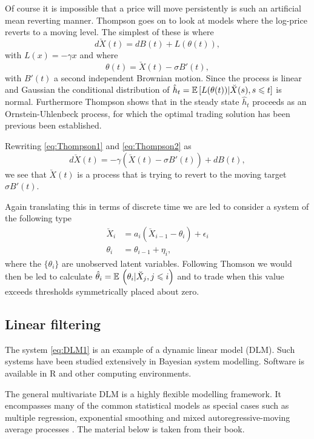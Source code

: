 Of course it is impossible that a price will move persistently is such an artificial mean reverting manner. Thompson goes on to look at models where the log-price reverts to a moving level. The simplest of these is where 
\begin{equation}\label{eq:Thompson1} d\breve{X}(t) = dB(t) + L(\theta(t)),\end{equation}
with $L(x) = -\gamma x$ and where
\begin{equation}\label{eq:Thompson2} \theta(t) = \breve{X}(t) - \sigma B'(t),\end{equation}
with $B'(t)$ a second independent Brownian motion. Since the process is linear and Gaussian the conditional distribution of $\hat{h}_t = \mathbb{E}\,[L(\theta(t)) |\breve{X}(s), s\leqslant t]$ is normal.  Furthermore Thompson shows that in the steady state $\hat{h}_t$  proceeds as an Ornstein-Uhlenbeck process, for which the optimal trading solution has been previous been established.

Rewriting  \eqref{eq:Thompson1} and \eqref{eq:Thompson2}  as
$$d\breve{X}(t) = -\gamma\left(\breve{X}(t) - \sigma B'(t)\right) + dB(t),$$
we see that $\breve{X}(t)$ is a process that is trying to revert to the moving target $ \sigma B'(t)$. 

Again translating this in terms of discrete time we are led to consider a system of the following type
\begin{align}\label{eq:DLM1}
\breve{X}_i &= a_i \left(\breve{X}_{i-1} - \theta_i\right) + \epsilon_i \nonumber\\
\theta_i &= \theta_{i-1} + \eta_i,
\end{align}
where the $\{\theta_i\}$ are unobserved latent variables. Following Thomson we would then be led to calculate $\hat{\theta}_i = \mathbb{E}\,\left(\theta_i | \breve{X}_j, j \leqslant i\right)$ and to trade when this value exceeds thresholds symmetrically placed about zero. 

\subsection{Linear filtering}
The system \eqref{eq:DLM1} is an example of a dynamic linear model (DLM). Such systems have been studied extensively in Bayesian system modelling. Software is available in {\sf R} and other computing environments. 

The general multivariate DLM is a highly flexible modelling framework. It encompasses many of the common statistical models as special cases such as multiple regression,
exponential smoothing and mixed autoregressive-moving average processes \citep{west1989}.  The material below is taken from their book.  

